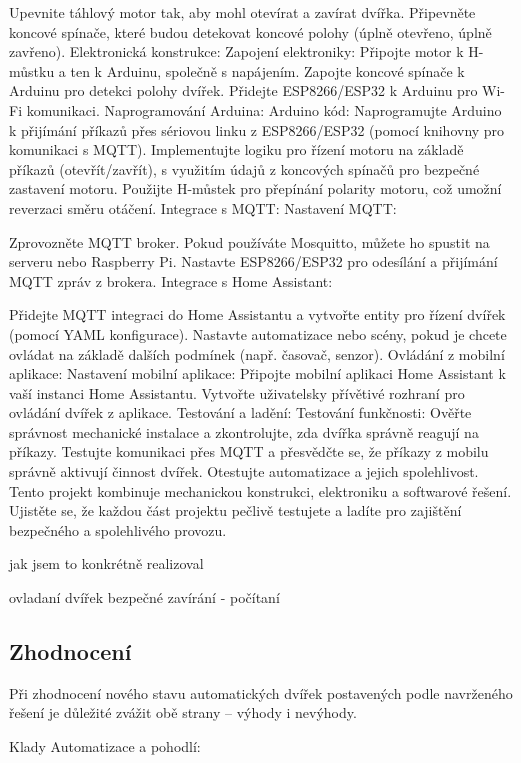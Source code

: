 Upevnite táhlový motor tak, aby mohl otevírat a zavírat dvířka.
Připevněte koncové spínače, které budou detekovat koncové polohy (úplně otevřeno, úplně zavřeno).
Elektronická konstrukce:
Zapojení elektroniky:
Připojte motor k H-můstku a ten k Arduinu, společně s napájením.
Zapojte koncové spínače k Arduinu pro detekci polohy dvířek.
Přidejte ESP8266/ESP32 k Arduinu pro Wi-Fi komunikaci.
Naprogramování Arduina:
Arduino kód:
Naprogramujte Arduino k přijímání příkazů přes sériovou linku z ESP8266/ESP32 (pomocí knihovny pro komunikaci s MQTT).
Implementujte logiku pro řízení motoru na základě příkazů (otevřít/zavřít), s využitím údajů z koncových spínačů pro bezpečné zastavení motoru.
Použijte H-můstek pro přepínání polarity motoru, což umožní reverzaci směru otáčení.
Integrace s MQTT:
Nastavení MQTT:

Zprovozněte MQTT broker. Pokud používáte Mosquitto, můžete ho spustit na serveru nebo Raspberry Pi.
Nastavte ESP8266/ESP32 pro odesílání a přijímání MQTT zpráv z brokera.
Integrace s Home Assistant:

Přidejte MQTT integraci do Home Assistantu a vytvořte entity pro řízení dvířek (pomocí YAML konfigurace).
Nastavte automatizace nebo scény, pokud je chcete ovládat na základě dalších podmínek (např. časovač, senzor).
Ovládání z mobilní aplikace:
Nastavení mobilní aplikace:
Připojte mobilní aplikaci Home Assistant k vaší instanci Home Assistantu.
Vytvořte uživatelsky přívětivé rozhraní pro ovládání dvířek z aplikace.
Testování a ladění:
Testování funkčnosti:
Ověřte správnost mechanické instalace a zkontrolujte, zda dvířka správně reagují na příkazy.
Testujte komunikaci přes MQTT a přesvědčte se, že příkazy z mobilu správně aktivují činnost dvířek.
Otestujte automatizace a jejich spolehlivost.
Tento projekt kombinuje mechanickou konstrukci, elektroniku a softwarové řešení. Ujistěte se, že každou část projektu pečlivě testujete a ladíte pro zajištění bezpečného a spolehlivého provozu.


jak jsem to konkrétně realizoval

ovladaní dvířek
bezpečné zavírání - počítaní
\subsection{Zhodnocení}\label{subsec:chytra-dvirka-zhodnoceni}

Při zhodnocení nového stavu automatických dvířek postavených podle navrženého řešení je důležité zvážit obě strany – výhody i nevýhody.

Klady
Automatizace a pohodlí:

